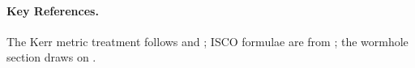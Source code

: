 











\paragraph{Key References.}
The Kerr metric treatment follows \cite{Visser2007} and \cite{Wald1984}; ISCO
formulae are from \cite{Bardeen1972}; the wormhole section draws on
\cite{MorrisThorne1988}.
